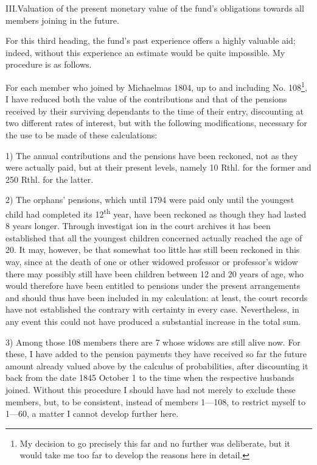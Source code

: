 \par\medskip\noindent III.\quad Valuation of the present monetary value of the fund's obligations towards all members joining in the future.\par\smallskip
For this third heading, the fund's past experience offers a highly valuable aid; indeed, without this experience an estimate would be quite impossible. My procedure is as follows.

For each member who joined by Michaelmas 1804, up to and including No. 108\footnote{My decision to go precisely this far and no further was deliberate, but it would take me too far to develop the reasons here in detail.}, I have reduced both the value of the contributions and that of the pensions received by their surviving dependants to the time of their entry, discounting at two different rates of interest, but with the following modifications, necessary for the use to be made of these calculations:

1) The annual contributions and the pensions have been reckoned, not as they were actually paid, but at their present levels, namely 10 Rthl. for the former and 250 Rthl. for the latter.

2) The orphans' pensions, which until 1794 were paid only until the youngest child had completed its 12\textsuperscript{th} year, have been reckoned as though they had lasted 8 years longer. Through investigat%
ion in the court archives it has been established that all the youngest children concerned actually reached the age of 20. It may, however, be that somewhat too little has still been reckoned in this way, since at the death of one or other widowed professor or professor's widow there may possibly still have been children between 12 and 20 years of age, who would therefore have been entitled to pensions under the present arrangements and should thus have been included in my calculation: at least, the court records have not established the contrary with certainty in every case. Nevertheless, in any event this could not have produced a substantial increase in the total sum.

3) Among those 108 members there are 7 whose widows are still alive now. For these, I have added to the pension payments they have received so far the future amount already valued above by the calculus of probabilities, after discounting it back from the date 1845 October 1 to the time when the respective husbands joined. Without this procedure I should have had not merely to exclude these members, but, to be consistent, instead of members 1—108, to restrict myself to 1—60, a matter I cannot develop further here.

